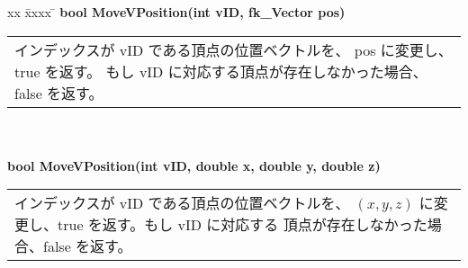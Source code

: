 \begin{tabbing}
xx \= xxxx \= \kill
\> \textbf{bool MoveVPosition(int vID, fk\_Vector pos)} \\
	\> \> \begin{tabular}{p{15cm}}
		インデックスが vID である頂点の位置ベクトルを、
		pos に変更し、true を返す。
		もし vID に対応する頂点が存在しなかった場合、false を返す。
	\end{tabular} \\ \\

\> \textbf{bool MoveVPosition(int vID, double x, double y, double z)} \\
	\> \> \begin{tabular}{p{15cm}}
		インデックスが vID である頂点の位置ベクトルを、
		\((x, y, z)\) に変更し、true を返す。もし vID に対応する
		頂点が存在しなかった場合、false を返す。
	\end{tabular}
\end{tabbing}

